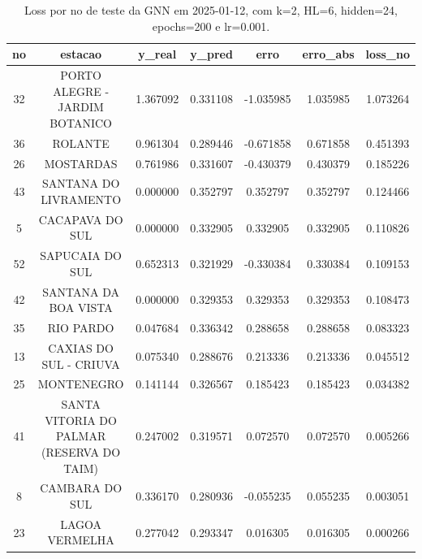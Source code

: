 \begin{table}[h]
\centering
\caption{Loss por no de teste da GNN em 2025-01-12, com k=2, HL=6, hidden=24, epochs=200 e lr=0.001.}
\label{tab:gnn_loss_k2_hl6_h24_e200_d20250112}
\begin{tabular}{ccccccc}
\toprule
no & estacao & y\_real & y\_pred & erro & erro\_abs & loss\_no \\
\midrule
32 & PORTO ALEGRE - JARDIM BOTANICO & 1.367092 & 0.331108 & -1.035985 & 1.035985 & 1.073264 \\
36 & ROLANTE & 0.961304 & 0.289446 & -0.671858 & 0.671858 & 0.451393 \\
26 & MOSTARDAS & 0.761986 & 0.331607 & -0.430379 & 0.430379 & 0.185226 \\
43 & SANTANA DO LIVRAMENTO & 0.000000 & 0.352797 & 0.352797 & 0.352797 & 0.124466 \\
5 & CACAPAVA DO SUL & 0.000000 & 0.332905 & 0.332905 & 0.332905 & 0.110826 \\
52 & SAPUCAIA DO SUL & 0.652313 & 0.321929 & -0.330384 & 0.330384 & 0.109153 \\
42 & SANTANA DA BOA VISTA & 0.000000 & 0.329353 & 0.329353 & 0.329353 & 0.108473 \\
35 & RIO PARDO & 0.047684 & 0.336342 & 0.288658 & 0.288658 & 0.083323 \\
13 & CAXIAS DO SUL - CRIUVA & 0.075340 & 0.288676 & 0.213336 & 0.213336 & 0.045512 \\
25 & MONTENEGRO & 0.141144 & 0.326567 & 0.185423 & 0.185423 & 0.034382 \\
41 & SANTA VITORIA DO PALMAR (RESERVA DO TAIM) & 0.247002 & 0.319571 & 0.072570 & 0.072570 & 0.005266 \\
8 & CAMBARA DO SUL & 0.336170 & 0.280936 & -0.055235 & 0.055235 & 0.003051 \\
23 & LAGOA VERMELHA & 0.277042 & 0.293347 & 0.016305 & 0.016305 & 0.000266 \\
\bottomrule
\end{tabular}
\end{table}
